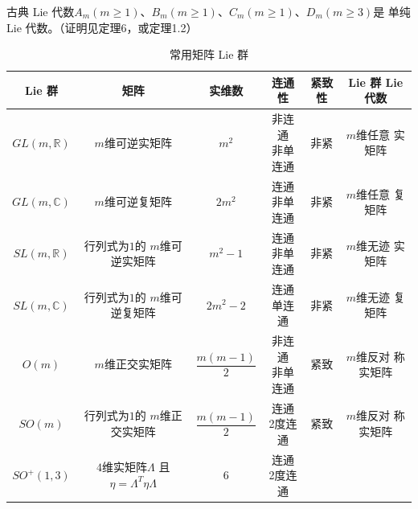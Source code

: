 \begin{theorem}\label{chlg:thm_CLA-simple}
	古典 Lie 代数$A_m(m\geqslant 1)$、$B_m(m\geqslant 1)$、$C_m(m\geqslant 1)$、$D_m(m\geqslant 3)$是
	单纯 Lie 代数。（证明见\parencite[p.148]{huangxg-2024}定理6，或\parencite[\S 1.3]{wanzx-2013}定理1.2）
\end{theorem}


\begin{table}[htb]
    \centering
    \caption{常用矩阵 Lie 群} \label{chlg:tab_groups}
    \begin{tabular}{|*6{c|}}
        \hline
         Lie 群 &矩阵 & 实维数 &连通性  & 紧致性 &  Lie 群 Lie 代数   \\        \hline
        $GL(m,\mathbb{R})$ & $m$维可逆实矩阵 & $m^2$  & \makecell{非连通\\非单连通 }
        & 非紧 & \makecell{$m$维任意\\ 实矩阵}   \\ \hline
        $GL(m,\mathbb{C})$& $m$维可逆复矩阵 & $2 m^2$ & \makecell{连通 \\非单连通 }
        & 非紧 & \makecell{$m$维任意\\ 复矩阵}  \\ \hline
        $SL(m,\mathbb{R})$ & \makecell{行列式为$1$的\\$m$维可逆实矩阵} & $m^2-1$  &  \makecell{连通 \\ 非单连通 } 
        & 非紧 & \makecell{$m$维无迹\\ 实矩阵}  \\ \hline
        $SL(m,\mathbb{C})$ & \makecell{行列式为$1$的\\$m$维可逆复矩阵} & $2m^2-2$ & \makecell{连通\\单连通 }
        & 非紧 & \makecell{$m$维无迹\\ 复矩阵}  \\ \hline
        $O(m)$  & $m$维正交实矩阵 & $\dfrac{m(m-1)}{2}$  & \makecell{非连通\\非单连通 } 
        & 紧致 & \makecell{$m$维反对\\ 称实矩阵} \\ \hline
        $SO(m)$ & \makecell{行列式为$1$的\\$m$维正交实矩阵} &$\dfrac{m(m-1)}{2}$ & \makecell{连通\\2度连通 }
        & 紧致 & \makecell{$m$维反对\\ 称实矩阵}  \\ \hline
        $SO^{+}(1,3)$ & \makecell{$4$维实矩阵$\Lambda$\\且$\eta=\Lambda^T \eta \Lambda$} & $6$ & \makecell{连通\\2度连通 }

\end{tabular}
\end{table}
